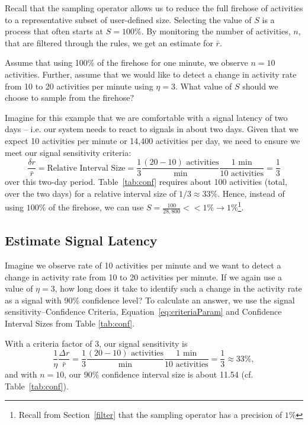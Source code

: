 \documentclass{article}
\begin{document}
Recall that the sampling operator allows us to reduce the full firehose of activities to a representative 
subset of user-defined size. Selecting the value of $S$ is a process that often starts at $S =100\%$.  
By monitoring the number of activities, $n$, that are filtered through the rules, we get an 
estimate for $\bar{r}$.

Assume that using 100\% of the firehose for one minute, we observe $n = 10$ activities. Further, assume 
that we would like to detect a change in activity rate from 10 to 20 activities per minute using 
$\eta = 3$. What value of $S$ should we choose to sample from the firehose?

Imagine for this example that we are comfortable with a signal latency of two days -- i.e. our system 
needs to react to signals in about two days. Given that we expect 10 activities per minute or 
14,400 activities per day, we need to ensure we meet our signal sensitivity criteria:
\begin{equation}
\label{eq:ex1:criteria}
\frac{\delta r}{\bar{r}} = \text{Relative Interval Size} = 
	\frac{1}{3} 
	\frac{(20-10) \text{ activities}}{\text{min}} 
	\frac{1 \text{ min}}{10 \text{ activities}} = \frac{1}{3} 
\end{equation}
over this two-day period. Table~\ref{tab:conf} requires about 100 activities (total, over the two days) 
for a relative interval size of $1/3 \approx 33\%$. Hence, instead of using $100\%$ of the 
firehose, we can use $S = \frac{100}{28,800} << 1\% \rightarrow 1\%$\footnote{Recall from 
Section~\ref{filter} that the sampling operator has a precision of $1\%$}.



   
\subsection{Estimate Signal Latency} 
\label{ex:2}


Imagine we observe rate of 10 activities per minute and we want to detect a change in activity 
rate from 10  to 20 activities per minute.  If we again use a value of $\eta = 3$, how long 
does it take to identify such a change in 
the activity rate as a signal with 90\% confidence level? To calculate an answer, we use the 
signal sensitivity--Confidence Criteria, Equation~\ref{eq:criteriaParam} and Confidence Interval 
Sizes from Table \ref{tab:conf}.

With a criteria factor of 3, our signal sensitivity is
\begin{equation}
\label{eq:ex2:latency}
\frac{1}{\eta} \frac{\Delta r}{\bar{r}} = 	
	\frac{1}{3} 
	\frac{(20-10) \text{ activities}}{\text{min}} 
	\frac{1 \text{ min}}{10 \text{ activities}} = \frac{1}{3} \approx 33\%,
\end{equation}
and with $n = 10$, our $90\%$ confidence interval size is about 11.54 (cf. Table~\ref{tab:conf}). 
\end{document}
